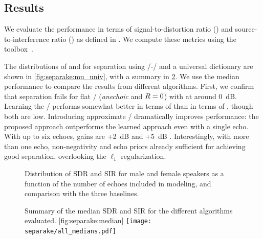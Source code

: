 \subsection{Results}
\label{sec:results}

We evaluate the performance in terms of signal-to-distortion ratio (\SDR) and source-to-interference ratio (\SIR) as defined in .
We compute these metrics using the  toolbox~.

\mynewline
The distributions of \SDR{} and \SIR{} for separation using \MU/-\NMF/ and a universal dictionary are shown in \cref{fig:separake:mu_univ}, with a summary in \cref{fig:separake:median}.
We use the median performance to compare the results from different algorithms.
First, we confirm that separation fails for flat \RTFs/ (\textit{anechoic} and $R=0$) with \SIR{} at around 0~dB.
Learning the \RTFs/ performs somewhat better in terms of \SIR{} than in terms of \SDR{}, though both are low.
Introducing approximate \RTFs/ dramatically improves performance: the proposed approach outperforms the learned approach even with a single echo.
With up to six echoes, gains are +2~dB \SDR{} and +5~dB \SIR{}.
Interestingly, with more than one echo, non-negativity and echo priors already sufficient for achieving good separation, overlooking the $\ell_1$ regularization.


\begin{figure}[t]
    \begin{fullwidth}
    \centering
    \hfill
    \hfill
    \caption{Distribution of SDR and SIR for male and female speakers as a function of the number of echoes included in modeling, and comparison with the three baselines.}
    \label{fig:separake:results}
    \end{fullwidth}
\end{figure}


\begin{figure}[b]
    \begin{sidecaption}[]{
            Summary of the median SDR and SIR for the different algorithms evaluated.
            \label{fig:separake:median}
        }[fig:separake:median]
        \centering
        \small
        \texttt{[image: separake/all\_medians.pdf]}
    \end{sidecaption}
\end{figure}


